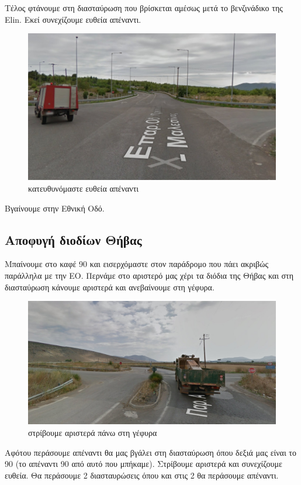 Τέλος φτάνουμε στη διασταύρωση που βρίσκεται αμέσως μετά το βενζινάδικο της Elin. Εκεί συνεχίζουμε ευθεία απέναντι.
\begin{figure}[H]
\includegraphics[width=\textwidth]{images/lamia-athina/tragana/tragana_014.jpg} 
\caption{κατευθυνόμαστε ευθεία απέναντι}
\end{figure}
Βγαίνουμε στην Εθνική Οδό.
\newpage
\begin{center}
\section*{Αποφυγή διοδίων Θήβας}
\end{center}
Μπαίνουμε στο καφέ 90 και εισερχόμαστε στον παράδρομο που πάει ακριβώς παράλληλα με την ΕΟ. Περνάμε στο αριστερό μας χέρι τα διόδια της Θήβας και στη διασταύρωση κάνουμε αριστερά και ανεβαίνουμε στη γέφυρα. 
\begin{figure}[H]
\includegraphics[width=\textwidth]{images/lamia-athina/thiva/thiva_015.jpg} 
\caption{στρίβουμε αριστερά πάνω στη γέφυρα}
\end{figure}
Αφότου περάσουμε απέναντι θα μας βγάλει στη διασταύρωση όπου δεξιά μας είναι το 90 (το απέναντι 90 από αυτό που μπήκαμε). Στρίβουμε αριστερά και συνεχίζουμε ευθεία. Θα περάσουμε 2 διασταυρώσεις όπου και στις 2 θα περάσουμε απέναντι.
